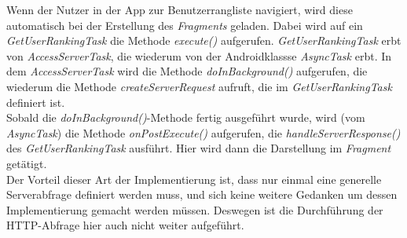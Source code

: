 
Wenn der Nutzer in der App zur Benutzerrangliste navigiert, wird diese automatisch bei der Erstellung des \emph{Fragments} geladen. Dabei wird auf ein \emph{GetUserRankingTask} die Methode \emph{execute()} aufgerufen. \emph{GetUserRankingTask} erbt von \emph{AccessServerTask}, die wiederum von der Androidklassse \emph{AsyncTask} erbt. In dem \emph{AccessServerTask} wird die Methode \emph{doInBackground()} aufgerufen, die wiederum die Methode \emph{createServerRequest} aufruft, die im \emph{GetUserRankingTask} definiert ist.\\
Sobald die \emph{doInBackground()}-Methode fertig ausgeführt wurde, wird (vom \emph{AsyncTask}) die Methode \emph{onPostExecute()} aufgerufen, die \emph{handleServerResponse()} des \emph{GetUserRankingTask} ausführt. Hier wird dann die Darstellung im \emph{Fragment} getätigt.\\
Der Vorteil dieser Art der Implementierung ist, dass nur einmal eine generelle Serverabfrage definiert werden muss, und sich keine weitere Gedanken um dessen Implementierung gemacht werden m\"ussen. Deswegen ist die Durchführung der HTTP-Abfrage hier auch nicht weiter aufgeführt.